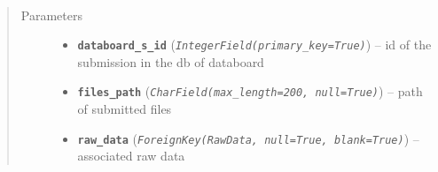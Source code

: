 \documentclass[letterpaper,10pt,english]{sphinxmanual}
\begin{document}

\begin{fulllineitems}
\label{modules/models:runapp.models.Submission}~\begin{quote}\begin{description}
\item[{Parameters}] \leavevmode\begin{itemize}
\item {} 
\textbf{\texttt{databoard\_s\_id}} (\emph{\texttt{IntegerField(primary\_key=True)}}) -- id of the submission in the db of databoard

\item {} 
\textbf{\texttt{files\_path}} (\emph{\texttt{CharField(max\_length=200, null=True)}}) -- path of submitted files

\item {} 
\textbf{\texttt{raw\_data}} (\emph{\texttt{ForeignKey(RawData, null=True, blank=True)}}) -- associated raw data

\end{itemize}

\end{description}\end{quote}

\end{fulllineitems}

\end{document}

